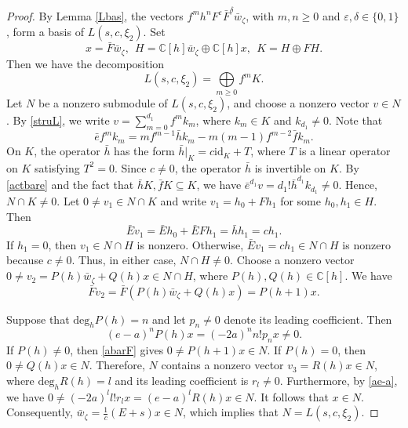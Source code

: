 \documentclass[a4paper,10pt]{article}
\theoremstyle{definition}
\theoremstyle{plain}
\theoremstyle{remark}
\theoremstyle{mystyle}
\numberwithin{equation}{section}
\begin{document}
\begin{proof}
     By Lemma \ref{Lbas}, the vectors $f^m h^n F^\varepsilon
     \bar F^\delta \bar w_{\zeta}$, with $m,n\geq 0$ and $\varepsilon,\delta\in\{0,1\}$, form a basis of $L(s,c,\xi_2)$. Set
    $$
    x=\bar F\bar w_{\zeta},\ \ H=\mathbb C[h]\bar w_{\zeta}\oplus \mathbb C[h]x,\ \ K=H\oplus FH.
    $$
    Then we have the decomposition 
    \begin{equation}\label{struL}
        L(s,c,\xi_2)=\bigoplus\limits_{m\geq 0}f^mK.
    \end{equation}
    Let $N$ be a nonzero submodule of $L(s,c,\xi_2)$, and choose a nonzero vector $v\in N$. By \eqref{struL}, we write $v=\sum\limits_{m=0}^{d_1}f^mk_m$, where $k_m\in K$ and $k_{d_1}\neq 0$.
    Note that
    \begin{equation}\label{actbare}
        \bar ef^mk_m=mf^{m-1}\bar h k_m-m(m-1)f^{m-2}\bar fk_m.
    \end{equation}
    On $K$, the operator $\bar h$ has the form $\bar h|_{K}=c\text{id}_{K}+T$, where $T$ is a linear operator on $K$ satisfying $T^2=0$. Since $c\neq 0$, the operator $\bar h$ is invertible on $K$. By \eqref{actbare} and the fact that $\bar hK,\bar fK\subseteq K$, we have  $ \bar e^{d_1}v=d_1!\bar h^{d_1}k_{d_1}\neq 0$. Hence, $N\cap K\neq 0$. Let $0\neq v_1\in N\cap K$ and write 
    $v_1=h_0+Fh_1$ for some $h_0,h_1\in H$. Then
    $$
        \bar Ev_1=\bar Eh_0+\bar EFh_1=\bar hh_1=ch_1.
    $$
    If $h_1=0$, then $v_1\in N\cap H$ is nonzero. Otherwise, $\bar Ev_1=ch_1\in N\cap H$ is nonzero because $c\neq 0$. Thus, in either case, $N\cap H\neq 0$. Choose a nonzero vector $0\neq v_2=P(h)\bar w_{\zeta}+Q(h)x\in N\cap H$, where $P(h),Q(h)\in \mathbb C[h]$. We have 
    \begin{equation}\label{abarF}
        \bar Fv_2=\bar F(P(h)\bar w_{\zeta }+Q(h)x)=P(h+1)x.
    \end{equation}

    Suppose that $\text{deg}_hP(h)=n$ and let $p_n\neq 0$ denote its leading coefficient‌. Then 
    \begin{equation}\label{ae-a}
        (e-a)^nP(h)x=(-2a)^nn!p_nx\neq 0.
    \end{equation}
    If $P(h)\neq 0$, then \eqref{abarF} gives $0\neq P(h+1)x\in N$. If $P(h)=0$, then $ 0\neq Q(h)x\in N$. Therefore, $N$ contains a nonzero vector $v_3=R(h)x\in N$, where $\text{deg}_hR(h)=l$ and its leading coefficient‌ is $r_l\neq 0$. Furthermore, by \eqref{ae-a}, we have $0\neq (-2a)^ll!r_lx=(e-a)^lR(h)x\in N$. It follows that $x\in N$. Consequently, $\bar w_{\zeta}=\frac{1}{c}(E+s)x\in N$, which implies that $N=L(s,c,\xi_2)$.
\end{proof}
\end{document}

